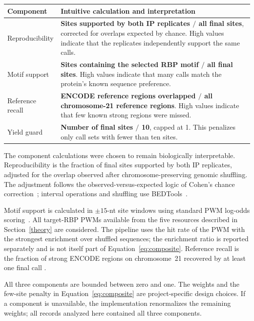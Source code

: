 \begin{center}
\small
\begin{tabularx}{\linewidth}{@{}l>{\raggedright\arraybackslash}X@{}}
\toprule
Component & Intuitive calculation and interpretation \\
\midrule
Reproducibility & \textbf{Sites supported by both IP replicates $/$ all final
sites}, corrected for overlaps expected by chance. High values indicate that the
replicates independently support the same calls. \\
Motif support & \textbf{Sites containing the selected RBP motif $/$ all final
sites}. High values indicate that many calls match the protein's known sequence
preference. \\
Reference recall & \textbf{ENCODE reference regions overlapped $/$ all
chromosome-21 reference regions}. High values indicate that few known strong
regions were missed. \\
Yield guard & \textbf{Number of final sites $/$ 10}, capped at 1. This penalizes
only call sets with fewer than ten sites. \\
\bottomrule
\end{tabularx}
\end{center}

The component calculations were chosen to remain biologically interpretable.
Reproducibility is the fraction of final sites supported by both IP replicates,
adjusted for the overlap observed after chromosome-preserving genomic shuffling.
The adjustment follows the observed-versus-expected logic of Cohen's chance
correction~\parencite{cohen1960}; interval operations and shuffling use
BEDTools~\parencite{quinlan2010}.

Motif support is calculated in $\pm15$-nt site windows using standard PWM
log-odds scoring~\parencite{stormo1982}. All target-RBP PWMs available from the
five resources described in Section~\ref{theory} are considered. The pipeline
uses the hit rate of the PWM with the strongest enrichment over shuffled
sequences; the enrichment ratio is reported separately and is not itself part of
Equation~\ref{eq:composite}. Reference recall is the fraction of strong ENCODE
regions on chromosome~21 recovered by at least one final call
\parencite{vannostrand2020}.

All three components are bounded between zero and one. The weights and the
few-site penalty in Equation~\ref{eq:composite} are project-specific design
choices. If a component is unavailable, the implementation renormalizes the
remaining weights; all records analyzed here contained all three components.

